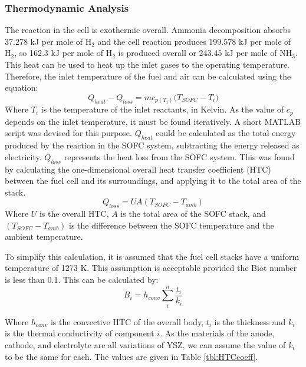     \subsubsection{Thermodynamic Analysis}
        The reaction in the cell is exothermic overall. Ammonia decomposition absorbs 37.278 kJ per mole of $\text{H}_{2}$ and the cell reaction produces 199.578 kJ per mole of $\text{H}_{2}$, so 162.3 kJ per mole of $\text{H}_{2}$ is produced overall \text{-} or 243.45 kJ per mole of $\text{NH}_{3}$. This heat can be used to heat up the inlet gases to the operating temperature. Therefore, the inlet temperature of the fuel and air can be calculated using the equation:
\begin{equation}
Q_{heat}- Q_{loss}=mc_{p(T_i)}  (T_{SOFC}-{ T_i)} 	
\label{LMeq:inlettemp}
\end{equation}
Where $T_i$ is the temperature of the inlet reactants, in Kelvin. As the value of $c_p$ depends on the inlet temperature, it must be found iteratively. A short MATLAB script was devised for this purpose. $Q_{heat}$ could be calculated as the total energy produced by the reaction in the SOFC system, subtracting the energy released as electricity.
 $Q_{loss}$ represents the heat loss from the SOFC system. This was found by calculating the one-dimensional overall heat transfer coefficient (HTC) between the fuel cell and its surroundings, and applying it to the total area of the stack.
 \begin{equation}
 Q_{loss}=UA(T_{SOFC}- T_{amb})
 \label{LMeq:heatlosscell}
 \end{equation}
Where $U$ is the overall HTC, $A$ is the total area of the SOFC stack, and $(T_{SOFC}- T_{amb})$ is the difference between the SOFC temperature and the ambient temperature.

To simplify this calculation, it is assumed that the fuel cell stacks have a uniform temperature of 1273 K. This assumption is acceptable provided the Biot number is less than 0.1. This can be calculated by:
\begin{equation}
 B_i=h_{conv} \sum\limits_{i}^n \frac{t_i}{k_i}  						
 \end{equation}

Where $h_{conv}$ is the convective HTC of the overall body, $t_i$ is the thickness and $k_i$ is the thermal conductivity of component $i$. As the materials of the anode, cathode, and electrolyte are all variations of YSZ, we can assume the value of $k_i$ to be the same for each. The values are given in Table \ref{tbl:HTCcoeff}.

